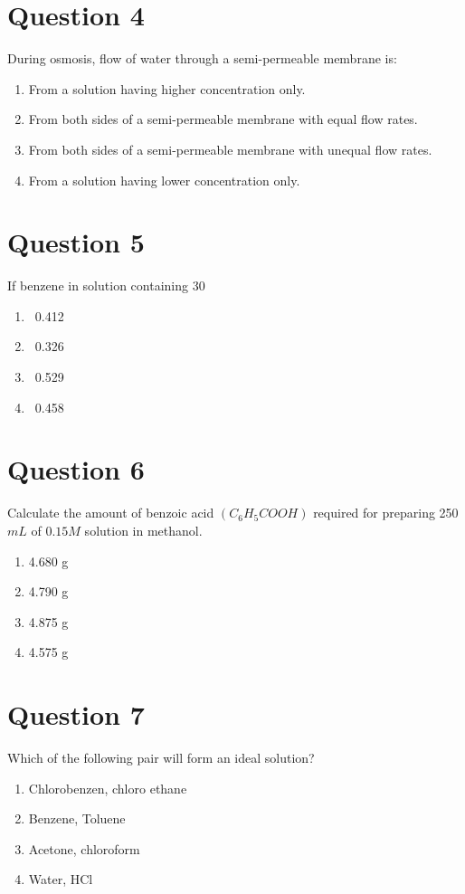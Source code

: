 \documentclass{article}
\begin{document}
\section*{Question 4}
During osmosis, flow of water through a semi-permeable membrane is:
\begin{enumerate}[label=(\alph*)]
\item From a solution having higher concentration only.
\item From both sides of a semi-permeable membrane with equal flow rates.
\item From both sides of a semi-permeable membrane with unequal flow rates.
\item From a solution having lower concentration only.
\end{enumerate}
\newpage
\section*{Question 5}
If benzene in solution containing 30%
\begin{enumerate}[label=(\alph*)]
\item  0.412
\item  0.326
\item  0.529
\item  0.458
\end{enumerate}
\newpage
\section*{Question 6}
Calculate the amount of benzoic acid \(\left({C}_{6} {H}_{5} {COOH}\right)\) required for preparing 250 \({mL}\) of \(0.15 {M}\) solution in methanol.
\begin{enumerate}[label=(\alph*)]
\item 4.680 g
\item 4.790 g
\item 4.875 g
\item 4.575 g
\end{enumerate}
\newpage
\section*{Question 7}
Which of the following pair will form an ideal solution?
\begin{enumerate}[label=(\alph*)]
\item Chlorobenzen, chloro ethane
\item Benzene, Toluene
\item Acetone, chloroform
\item Water, \(\mathrm{HCl}\)
\end{enumerate}
\newpage
\end{document}
